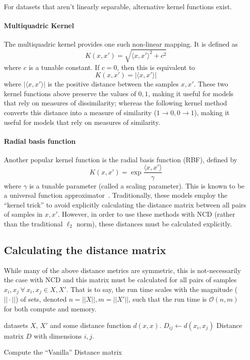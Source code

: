 \documentclass[conference]{IEEEtran}
\begin{document}
For datasets that aren't linearly separable, alternative kernel functions exist. 

\paragraph{Multiquadric Kernel}
\label{multiquadric_kernel}
The multiquadric kernel provides one such non-linear mapping. 
It is defined as 
$$
K(x, x') = \sqrt{\langle x, x' \rangle ^2 + c^2}
$$
where $c$ is a tunable constant. 
If $c=0$, then this is equivalent to
$$
K(x, x') = | \langle x, x' \rangle|
$$
where $| \langle x, x' \rangle |$ is the positive distance between the samples $x, x'$. 
These two kernel functions above preserve the values of $0,1$, making it useful for models that rely on measures of dissimilarity; whereas the following kernel method converts this distance into a measure of similarity ($1 \rightarrow 0, 0 \rightarrow 1$), making it useful for models that rely on measures of similarity.

\paragraph{Radial basis function}
\label{rbf_kernel}
Another popular kernel function is the radial basis function (RBF), defined by
$$
K(x, x') = \exp{\frac{\langle x, x' \rangle}{\gamma}}
$$
where $\gamma$ is a tunable parameter (called a scaling parameter). 
This is known to be a universal function approximator~\cite{}. 
Traditionally, these models employ the ``kernel trick'' to avoid explicitly calculating the distance matrix between all pairs of samples in $x,x'$. 
However, in order to use these methods with NCD (rather than the traditional $\ell_2$ norm), these distances must be calculated explicitly. 

\subsection{Calculating the distance matrix}
\label{gram_matrix}
While many of the above distance metrics are symmetric, this is not-necessarily the case with NCD and this matrix must be calculated for all pairs of samples $x_i, x_j~\forall~x_i,x_j \in X, X'$. 
That is to say, the run time scales with the magnitude ($ || \cdot || $) of sets, denoted $n = || X ||, m = || X' ||$, such that the run time is $\mathcal{O}(n,m)$ for both compute and memory.
\begin{algorithm}
    \begin{algorithmic}
        \Require datasets $X$, $X'$ and some distance function $d(x,x)$.
                \State $D_{ij} \gets d(x_i, x_j)$
            \EndFor
        \EndFor
        \State \Return Distance matrix $D$ with dimensions $i,j$.
    \end{algorithmic}
    \caption{Compute the ``Vanilla'' Distance matrix}
    \label{alg:vanilla}
\end{algorithm}
\end{document}
